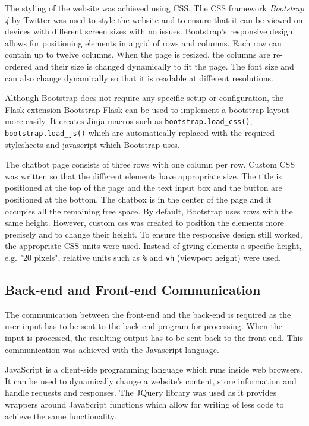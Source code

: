 \documentclass[12pt,a4paper]{article}
\begin{document}
The styling of the website was achieved using CSS. The CSS framework \textit{Bootstrap 4} by Twitter was used to style the website and to ensure that it can be viewed on devices with different screen sizes with no issues. Bootstrap's responsive design allows for positioning elements in a grid of rows and columns. Each row can contain up to twelve columns. When the page is resized, the columns are re-ordered and their size is changed dynamically to fit the page. The font size and can also change dynamically so that it is readable at different resolutions. 

Although Bootstrap does not require any specific setup or configuration, the Flask extension Bootstrap-Flask can be used to implement a bootstrap layout more easily. It creates Jinja macros such as \texttt{bootstrap.load\_css()}, \texttt{bootstrap.load\_js()} which are automatically replaced with the required stylesheets and javascript which Bootstrap uses.

The chatbot page consists of three rows with one column per row. Custom CSS was written so that the different elements have appropriate size. The title is positioned at the top of the page and the text input box and the button are positioned at the bottom. The chatbox is in the center of the page and it occupies all the remaining free space. By default, Bootstrap uses rows with the same height. However, custom css was created to position the elements more precisely and to change their height. To ensure the responsive design still worked, the appropriate CSS units were used. Instead of giving elements a specific height, e.g. "20 pixels", relative units such as \texttt{\%} and \texttt{vh} (viewport height) were used.

\subsection{Back-end and Front-end Communication}
The communication between the front-end and the back-end is required as the user input has to be sent to the back-end program for processing. When the input is processed, the resulting output has to be sent back to the front-end. This communication was achieved with the Javascript language. 

JavaScript is a client-side programming language which runs inside web browsers. It can be used to dynamically change a website's content, store information and handle requests and responses. The JQuery library was used as it provides wrappers around JavaScript functions which allow for writing of less code to achieve the same functionality.
\end{document}
